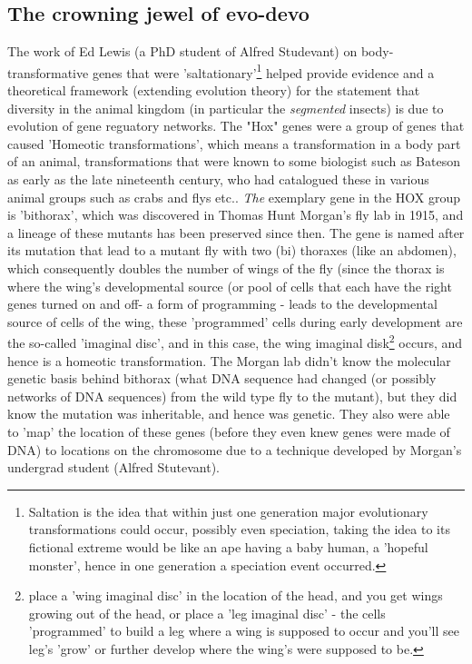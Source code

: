 \subsection{The crowning jewel of evo-devo}
The work of Ed Lewis (a PhD student of Alfred Studevant) on body-transformative genes that were 'saltationary'\footnote{Saltation is the idea that within just one generation major evolutionary transformations could occur, possibly even speciation, taking the idea to its fictional extreme would be like an ape having a baby human, a 'hopeful monster', hence in one generation a speciation event occurred.} helped provide evidence and a theoretical framework (extending evolution theory) for the statement that diversity in the animal kingdom (in particular the \textit{segmented} insects) is due to evolution of gene reguatory networks.  The "Hox" genes were a group of genes that caused 'Homeotic transformations', which means a transformation in a body part of an animal, transformations that were known to some biologist such as Bateson as early as the late nineteenth century, who had catalogued these in various animal groups such as crabs and flys etc..  \textit{The} exemplary gene in the HOX group is 'bithorax', which was discovered in Thomas Hunt Morgan's fly lab in 1915, and a lineage of these mutants has been preserved since then. The gene is named after its mutation that lead to a mutant fly with two (bi) thoraxes (like an abdomen), which consequently doubles the number of wings of the fly (since the thorax is where the wing's developmental source (or pool of cells that each have the right genes turned on and off- a form of programming - leads to the developmental source of cells of the wing, these 'programmed' cells during early development are the so-called 'imaginal disc', and in this case, the wing imaginal disk\footnote{place a 'wing imaginal disc' in the location of the head, and you get wings growing out of the head, or place a 'leg imaginal disc' - the cells 'programmed' to build a leg where a wing is supposed to occur and you'll see leg's 'grow' or further develop where the wing's were supposed to be.} occurs, and hence is a homeotic transformation.  The Morgan lab didn't know the molecular genetic basis behind bithorax (what DNA sequence had changed (or possibly networks of DNA sequences) from the wild type fly to the mutant), but they did know the mutation was inheritable, and hence was genetic.  They also were able to 'map' the location of these genes (before they even knew genes were made of DNA) to locations on the chromosome due to a technique developed by Morgan's undergrad student (Alfred Stutevant).  

